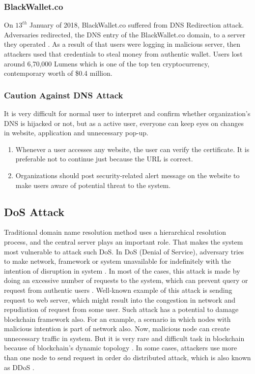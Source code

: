 \documentclass[a4paper,twoside,12pt]{report}
\begin{document}
\begin{spacing}{1.5}
\subsubsection{BlackWallet.co}
On $13^{th}$ January of 2018, BlackWallet.co suffered from DNS Redirection attack. Adversaries redirected, the DNS entry of the BlackWallet.co domain, to a server they operated \cite{blackwallet_nodate}. As a result of that users were logging in malicious server, then attackers used that credentials to steal money from authentic wallet. Users lost around 6,70,000 Lumens which is one of the top ten cryptocurrency, contemporary worth of \$0.4 million. 
\subsubsection{Caution Against DNS Attack}
It is very difficult for normal user to interpret and confirm whether organization's DNS is hijacked or not, but as a active user, everyone can keep eyes on changes in website, application and unnecessary pop-up. 
\begin{enumerate}
	\item{Whenever a user accesses any website, the user can verify the certificate. It is preferable not to continue just because the URL is correct.}
	\item{Organizations should post security-related alert message on the website to make users aware of potential threat to the system.}
\end{enumerate}
\subsection{DoS Attack}
Traditional domain name resolution method uses a hierarchical resolution process, and the central server plays an important role. That makes the system most vulnerable to attack such DoS. In DoS (Denial of Service), adversary tries to make network, framework or system unavailable for indefinitely with the intention of disruption in system \cite{chao-yang_dos_2011}. In most of the cases, this attack is made by doing an excessive number of requests to the system, which can prevent query or request from authentic users \cite{dos_wireless_singh_denial_2017}. Well-known example of this attack is sending request to web server, which might result into the congestion in network and repudiation of request from some user. Such attack has a potential to damage blockchain framework also. For an example, a scenario in which nodes with malicious intention is part of network also. Now, malicious node can create unnecessary traffic in system. But it is very rare and difficult task in blockchain because of blockchain's dynamic topology \cite{zaghloul_beginners_2018}. In some cases, attackers use more than one node to send request in order do distributed attack, which is also known as DDoS \cite{saad_exploring_2019}. 

\end{spacing}
\end{document}
